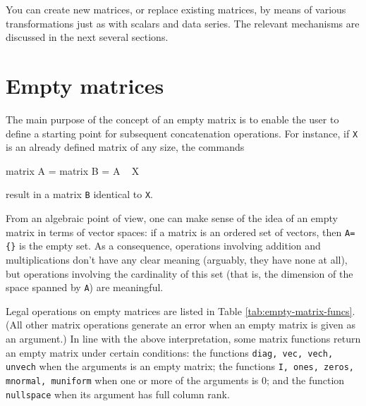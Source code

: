 
You can create new matrices, or replace existing matrices, by means of
various transformations just as with scalars and data series.  The
relevant mechanisms are discussed in the next several sections.

\section{Empty matrices}
\label{sec:emptymatrix}

The main purpose of the concept of an empty matrix is to enable the
user to define a starting point for subsequent concatenation
operations.  For instance, if \texttt{X} is an already defined
matrix of any size, the commands
%
\begin{code}
  matrix A = {}
  matrix B = A ~ X
\end{code}
%
result in a matrix \texttt{B} identical to \texttt{X}.

From an algebraic point of view, one can make sense of the idea of an
empty matrix in terms of vector spaces: if a matrix is an ordered set
of vectors, then \verb|A={}| is the empty set.  As a consequence,
operations involving addition and multiplications don't have any clear
meaning (arguably, they have none at all), but operations involving
the cardinality of this set (that is, the dimension of the space
spanned by \texttt{A}) are meaningful.

Legal operations on empty matrices are listed in Table
\ref{tab:empty-matrix-funcs}.  (All other matrix operations generate
an error when an empty matrix is given as an argument.)  In line with
the above interpretation, some matrix functions return an empty matrix
under certain conditions: the functions \texttt{diag, vec, vech,
  unvech} when the arguments is an empty matrix; the functions
\texttt{I, ones, zeros, mnormal, muniform} when one or more of the
arguments is 0; and the function \texttt{nullspace} when its argument
has full column rank.

